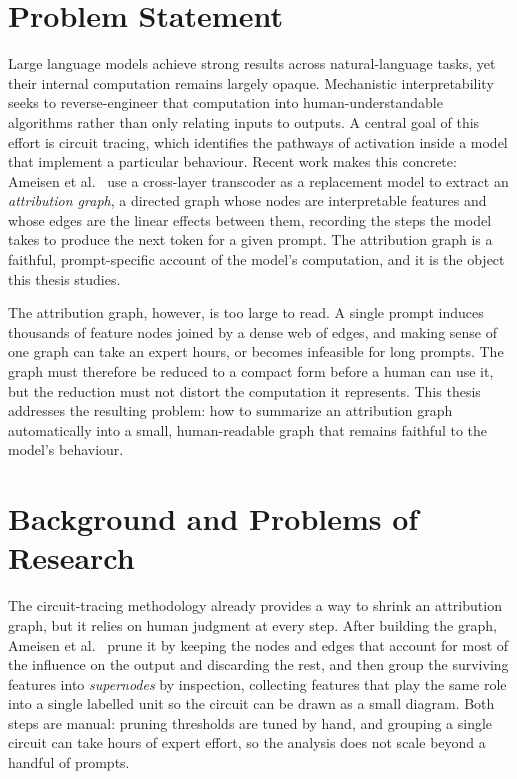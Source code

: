 \documentclass[../main.tex]{subfiles}
\begin{document}
\section{Problem Statement}
\label{sec:dvd}
Large language models achieve strong results across natural-language tasks, yet their
internal computation remains largely opaque. Mechanistic interpretability seeks to
reverse-engineer that computation into human-understandable algorithms rather than only
relating inputs to outputs. A central goal of this effort is circuit tracing, which
identifies the pathways of activation inside a model that implement a particular behaviour.
Recent work makes this concrete: Ameisen et al.~\cite{ameisen2025circuit} use a cross-layer
transcoder as a replacement model to extract an \emph{attribution graph}, a directed graph
whose nodes are interpretable features and whose edges are the linear effects between them,
recording the steps the model takes to produce the next token for a given prompt. The
attribution graph is a faithful, prompt-specific account of the model's computation, and
it is the object this thesis studies.

The attribution graph, however, is too large to read. A single prompt induces thousands of
feature nodes joined by a dense web of edges, and making sense of one graph can take an
expert hours, or becomes infeasible for long prompts. The graph must therefore be reduced
to a compact form before a human can use it, but the reduction must not distort the
computation it represents. This thesis addresses the resulting problem: how to summarize an
attribution graph automatically into a small, human-readable graph that remains faithful to
the model's behaviour.

\section{Background and Problems of Research}
\label{sec:giaiphap}
The circuit-tracing methodology already provides a way to shrink an attribution graph, but
it relies on human judgment at every step. After building the graph, Ameisen et
al.~\cite{ameisen2025circuit} prune it by keeping the nodes and edges that account
for most of the influence on the output and discarding the rest, and then group the
surviving features into \emph{supernodes} by inspection, collecting features that play the
same role into a single labelled unit so the circuit can be drawn as a small diagram. Both
steps are manual: pruning thresholds are tuned by hand, and grouping a single circuit can
take hours of expert effort, so the analysis does not scale beyond a handful of prompts.
\end{document}
